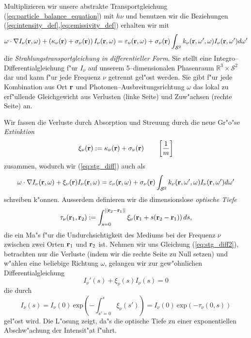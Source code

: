 	Multiplizieren wir unsere abstrakte Transportgleichung (\ref{eq:particle_balance_equation}) mit $h\nu$ und benutzen wir die Beziehungen (\ref{eq:intensity_def},\ref{eq:emissivity_def}) erhalten wir mit
	\begin{equation}\label{eq:stg_diff}
	  \omega\cdot\nabla I_\nu(\mathbf{r},\omega)+\left(\kappa_\nu(\mathbf{r})+\sigma_\nu(\mathbf{r})\right)I_\nu(\mathbf{r},\omega)
	  =\varepsilon_\nu(\mathbf{r},\omega)+\sigma_\nu(\mathbf{r})\int_{\mathcal{S}^2}k_\nu(\mathbf{r},\omega',\omega)I_\nu(\mathbf{r},\omega')d\omega'
	\end{equation}
	die {\em Strahlungstransportgleichung in differentieller Form}. Sie stellt eine Integro--Differentialgleichung f"ur $I_\nu$ auf unserem 5--dimensionalen Phasenraum $\mathbb{R}^3 \times \mathcal{S}^2$ dar und kann f"ur jede Frequenz $\nu$ getrennt gel"ost werden. Sie gibt f"ur jede Kombination aus Ort $\mathbf{r}$ und Photonen--Ausbreitungsrichtung $\omega$ das lokal zu erf"ullende Gleichgewicht aus Verlusten (linke Seite) und Zuw"achsen (rechte Seite) an.
	
	Wir fassen die Verluste durch Absorption und Streuung durch die neue Gr"o"se {\em Extinktion}
	$$\xi_\nu(\mathbf{r}):=\kappa_\nu(\mathbf{r})+\sigma_\nu(\mathbf{r}) \qquad\left[\frac{1}{m}\right]$$
	zusammen, wodurch wir (\ref{eq:stg_diff}) auch als
	\begin{equation}\label{eq:stg_diff2}
	  \omega\cdot\nabla I_\nu(\mathbf{r},\omega)+\xi_\nu(\mathbf{r})I_\nu(\mathbf{r},\omega)
	  =\varepsilon_\nu(\mathbf{r},\omega)+\sigma_\nu(\mathbf{r})\int_{\mathcal{S}^2}k_\nu(\mathbf{r},\omega',\omega)I_\nu(\mathbf{r},\omega')d\omega'
	\end{equation}
	schreiben k"onnen.
	Ausserdem definieren wir die dimensionslose {\em optische Tiefe}
	\begin{equation*}
		\tau_\nu(\mathbf{r}_1,\mathbf{r}_2):=\int_{s=0}^{||\mathbf{r}_2-\mathbf{r}_1||} \xi_\nu(\mathbf{r}_1+s(\mathbf{r}_2 - \mathbf{r}_1))\,ds,
	\end{equation*}
	die ein Ma"s f"ur die Undurchsichtigkeit des Mediums bei der Frequenz $\nu$ zwischen zwei Orten $\mathbf{r}_1$ und $\mathbf{r}_2$ ist. Nehmen wir uns Gleichung (\ref{eq:stg_diff2}), betrachten nur die Verluste (indem wir die rechte Seite zu Null setzen) und w"ahlen eine beliebige Richtung $\omega$, gelangen wir zur gew"ohnlichen Differentialgleichung
	$$I_\nu'(s)+\xi_\nu(s)I_\nu(s)=0$$
	die durch
	$$I_\nu(s)=I_\nu(0)\:\text{exp}\left(-\int_{s'=0}^s \xi_\nu(s')\right)=I_\nu(0)\:\text{exp}\left(-\tau_\nu(0,s)\right)$$
	gel"ost wird. Die L"osung zeigt, da"s die optische Tiefe zu einer exponentiellen Abschw"achung der Intensit"at f"uhrt.
	
